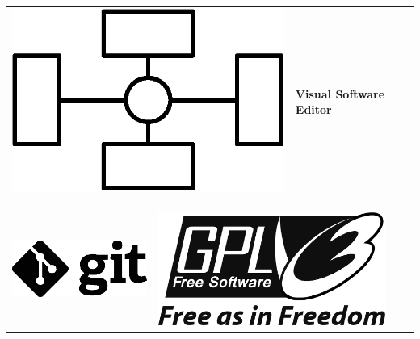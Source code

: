 \documentclass[11pt]{article}
\newlength{\picw}
\begin{document}
	\sloppy

	\clearpage
	\thispagestyle{empty}

	\centering
	{
		\begin{tabular}{MMMM}
			\includegraphics[width=\picw]{logo} &
			\LARGE{\textbf{Visual Software Editor}}
		\end{tabular}
	}
	{
		\begin{tabular}{MMMM}
			\includegraphics[width=\picw]{git_logo_black} &
			\includegraphics[width=\picw]{gplv3_logo_black}
		\end{tabular}
	}
\end{document}
